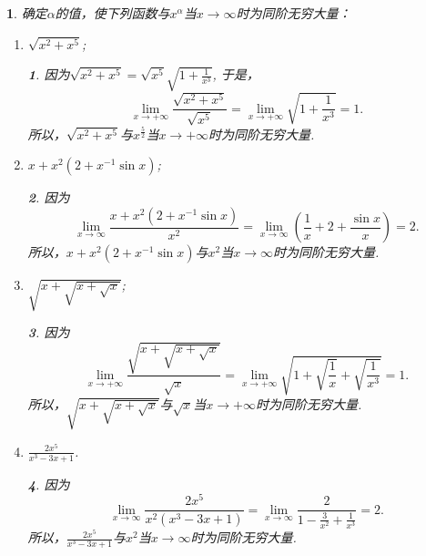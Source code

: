 \documentclass[utf8]{book}
\newtheorem{example}{}[section]             %
\newtheorem{solution}{}
\begin{document}
\begin{example}
确定$\alpha$的值，使下列函数与$x^{\alpha}$当$x\to \infty$时为同阶无穷大量：
\renewcommand\labelenumi{\normalfont(\theenumi)}
\begin{enumerate}
\item $\sqrt{x^2+x^5}$;
\begin{solution}因为$\sqrt{x^2+x^5}=\sqrt{x^5}\sqrt{1+\frac{1}{x^3}}$,
于是，
$$\displaystyle\lim_{x\to +\infty}\frac{\sqrt{x^2+x^5}}{\sqrt{x^5}} = \displaystyle\lim_{x\to +\infty}\sqrt{1+\frac{1}{x^3}}=1.$$
所以，$\sqrt{x^2+x^5}$与$x^{\frac{5}{2}}$当$x\to +\infty$时为同阶无穷大量.
\end{solution}
\item $x+x^2(2+x^{-1}\sin{x})$;
\begin{solution}因为
$$\displaystyle\lim_{x\to \infty}\frac{x+x^2(2+x^{-1}\sin{x})}{x^2}=\displaystyle\lim_{x\to \infty}\left(\frac{1}{x}+2 +\frac{\sin{x}}{x}\right)=2.$$
所以，$x+x^2(2+x^{-1}\sin{x})$与$x^2$当$x\to \infty$时为同阶无穷大量.
\end{solution}
\item $\sqrt{x+\sqrt{x+\sqrt{x}}}$;
\begin{solution}因为
$$\displaystyle\lim_{x\to +\infty}\frac{\sqrt{x+\sqrt{x+\sqrt{x}}}}{\sqrt{x}}=\displaystyle\lim_{x\to +\infty}\sqrt{1+\sqrt{\frac{1}{x}}+\sqrt{\frac{1}{x^3}}}=1.$$
所以，$\sqrt{x+\sqrt{x+\sqrt{x}}}$与$\sqrt{x}$当$x\to +\infty$时为同阶无穷大量.
\end{solution}
\item $\displaystyle\frac{2x^5}{x^3-3x+1}$.
\begin{solution}因为
$$\displaystyle\lim_{x\to \infty}\frac{2x^5}{x^2(x^3-3x+1)}=\displaystyle\lim_{x\to \infty}\frac{2}{1-\displaystyle\frac{3}{x^2}+\frac{1}{x^3}}=2.$$
所以，$\displaystyle\frac{2x^5}{x^3-3x+1}$与$x^2$当$x\to \infty$时为同阶无穷大量.
\end{solution}
\end{enumerate}
\end{example}
\end{document}

